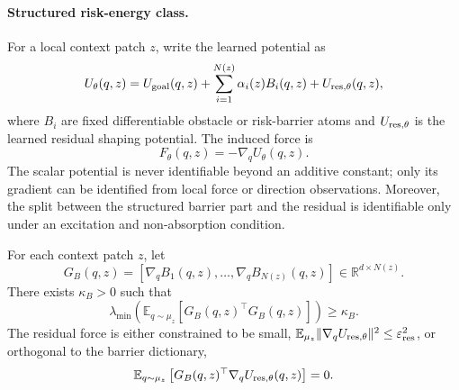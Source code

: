 \paragraph{Structured risk-energy class.}
For a local context patch $z$, write the learned potential as
\begin{equation}
    U_\theta(q,z)
    =
    U_{\rm goal}(q,z)
    +
    \sum_{i=1}^{N(z)} \alpha_i(z) B_i(q,z)
    +
    U_{{\rm res},\theta}(q,z),
    \label{eq:app:structured_energy}
\end{equation}
where $B_i$ are fixed differentiable obstacle or risk-barrier atoms and
$U_{{\rm res},\theta}$ is the learned residual shaping potential. The induced force is
\begin{equation}
    F_\theta(q,z)
    =
    -\nabla_q U_\theta(q,z).
\end{equation}
The scalar potential is never identifiable beyond an additive constant; only its
gradient can be identified from local force or direction observations. Moreover, the
split between the structured barrier part and the residual is identifiable only under an
excitation and non-absorption condition.

\begin{assumption}
\label{ass:barrier_excitation}
For each context patch $z$, let
\[
    G_B(q,z)
    =
    [\nabla_q B_1(q,z),\dots,\nabla_q B_{N(z)}(q,z)]\in\mathbb R^{d\times N(z)}.
\]
There exists $\kappa_B>0$ such that
\begin{equation}
    \lambda_{\min}
    \left(
    \mathbb E_{q\sim\mu_z}[G_B(q,z)^\top G_B(q,z)]
    \right)
    \ge \kappa_B .
    \label{eq:app:barrier_gram}
\end{equation}
The residual force is either constrained to be small,
$\mathbb E_{\mu_z}\|\nabla_qU_{{\rm res},\theta}\|^2\le \varepsilon_{\rm res}^2$, or
orthogonal to the barrier dictionary,
\begin{equation}
    \mathbb E_{q\sim\mu_z}
    \left[G_B(q,z)^\top \nabla_qU_{{\rm res},\theta}(q,z)\right]=0 .
\end{equation}
\end{assumption}

